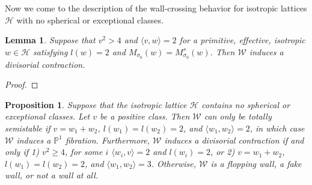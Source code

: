 \documentclass[leqno,11pt]{amsart}
\def\P{\ensuremath{\mathbb{P}}}
\newtheorem{Prop}[Thm]{Proposition}
\newtheorem{Lem}[Thm]{Lemma}
\theoremstyle{definition}
\def\P{\ensuremath{\mathbb{P}}}
\def\HH{\ensuremath{\mathcal H}}
\def\WW{\ensuremath{\mathcal W}}
\begin{document}
Now we come to the description of the wall-crossing behavior for isotropic lattices $\HH$ with no spherical or exceptional classes.

\begin{Lem}\label{Lem:no spherical or exceptional divisorial contraction}
Suppose that $v^2>4$ and $\langle v,w\rangle=2$ for a primitive, effective, isotropic $w\in\HH$ satisfying $l(w)=2$ and $M_{\sigma_0}(w)=M^s_{\sigma_0}(w)$.  Then $\WW$ induces a divisorial contraction.
\end{Lem}
\begin{proof}

\end{proof}



\begin{Prop}
Suppose that the isotropic lattice $\HH$ contains no spherical or exceptional classes.  Let $v$ be a positive class.  Then $\WW$ can only be totally semistable if $v=w_1+w_2$, $l(w_1)=l(w_2)=2$, and $\langle w_1,w_2\rangle=2$, in which case $\WW$ induces a $\P^1$ fibration.  Furthermore, $\WW$ induces a divisorial contraction if and only if 1) $v^2\geq 4$, for some $i$ $\langle w_i,v\rangle=2$ and $l(w_i)=2$, or 2) $v=w_1+w_2$, $l(w_1)=l(w_2)=2$, and $\langle w_1,w_2\rangle=3$.  Otherwise, $\WW$ is a flopping wall, a fake wall, or not a wall at all.
\end{Prop}
\end{document}

